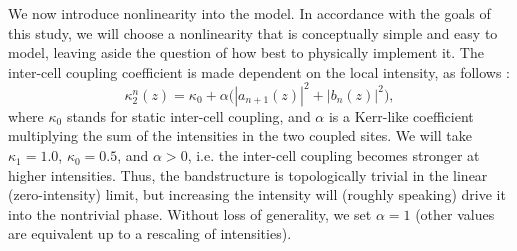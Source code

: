 \documentclass[aps,prx,twocolumn,superscriptaddress]{revtex4-1}
\begin{document}
We now introduce nonlinearity into the model.  In accordance with the goals of this study, we will choose a nonlinearity that is conceptually simple and easy to model, leaving aside the question of how best to physically implement it.  The inter-cell coupling coefficient is made dependent on the local intensity, as follows \cite{alu2016}:
\begin{equation}
  \kappa_2^n(z) = \kappa_0 + \alpha \Big(|a_{n+1}(z)|^2 + |b_n(z)|^2 \Big),
  \label{ssh_nonlinearity}
\end{equation}
where $\kappa_0$ stands for static inter-cell coupling, and $\alpha$ is a Kerr-like coefficient multiplying the sum of the intensities in the two coupled sites.  We will take $\kappa_1=1.0$, $\kappa_0=0.5$, and $\alpha > 0$, i.e. the inter-cell coupling becomes stronger at higher intensities. Thus, the bandstructure is topologically trivial in the linear (zero-intensity) limit, but increasing the intensity will (roughly speaking) drive it into the nontrivial phase.  Without loss of generality, we set $\alpha = 1$ (other values are equivalent up to a rescaling of intensities).
\end{document}
